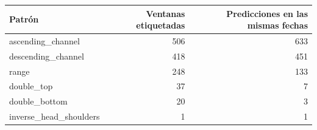 \begin{tabular}{lrr}
\toprule
                Patrón &  Ventanas etiquetadas &  Predicciones en las mismas fechas \\
\midrule
     ascending\_channel &                   506 &                                633 \\
    descending\_channel &                   418 &                                451 \\
                 range &                   248 &                                133 \\
            double\_top &                    37 &                                  7 \\
         double\_bottom &                    20 &                                  3 \\
inverse\_head\_shoulders &                     1 &                                  1 \\
\bottomrule
\end{tabular}
